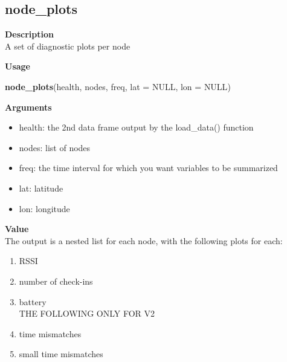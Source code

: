 \documentclass[
]{book}
\newenvironment{Shaded}{\begin{snugshade}}{\end{snugshade}}
\newcommand{\AttributeTok}[1]{\textcolor[rgb]{0.13,0.29,0.53}{#1}}
\newcommand{\ConstantTok}[1]{\textcolor[rgb]{0.56,0.35,0.01}{#1}}
\newcommand{\FunctionTok}[1]{\textcolor[rgb]{0.13,0.29,0.53}{\textbf{#1}}}
\newcommand{\NormalTok}[1]{#1}
\providecommand{\tightlist}{%
  \setlength{\itemsep}{0pt}\setlength{\parskip}{0pt}}
\begin{document}
\subsection{node\_plots}\label{node_plots}

\textbf{Description}\\
A set of diagnostic plots per node

\textbf{Usage}

\begin{Shaded}
\begin{Highlighting}[]
\FunctionTok{node\_plots}\NormalTok{(health, nodes, freq, }\AttributeTok{lat =} \ConstantTok{NULL}\NormalTok{, }\AttributeTok{lon =} \ConstantTok{NULL}\NormalTok{)}
\end{Highlighting}
\end{Shaded}

\textbf{Arguments}

\begin{itemize}
\tightlist
\item
  health: the 2nd data frame output by the load\_data() function\\
\item
  nodes: list of nodes\\
\item
  freq: the time interval for which you want variables to be summarized\\
\item
  lat: latitude\\
\item
  lon: longitude
\end{itemize}

\textbf{Value}\\
The output is a nested list for each node, with the following plots for each:

\begin{enumerate}
\def\labelenumi{\arabic{enumi}.}
\tightlist
\item
  RSSI\\
\item
  number of check-ins\\
\item
  battery\\
  THE FOLLOWING ONLY FOR V2\\
\item
  time mismatches\\
\item
  small time mismatches
\end{enumerate}
\end{document}
